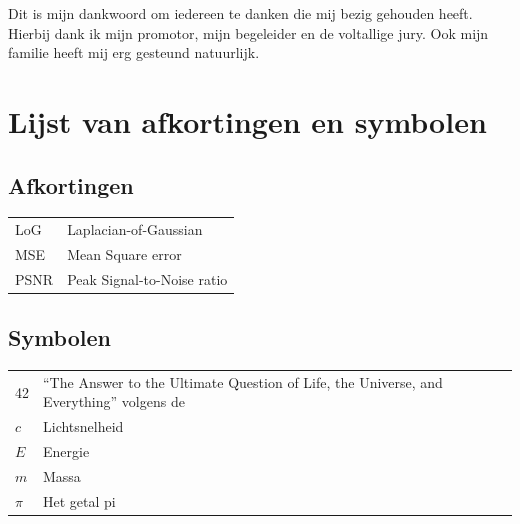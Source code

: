 \documentclass[master=elt,masteroption=ec]{kulemt}
\begin{document}
\begin{preface}
  Dit is mijn dankwoord om iedereen te danken die mij bezig gehouden heeft.
  Hierbij dank ik mijn promotor, mijn begeleider en de voltallige jury.
  Ook mijn familie heeft mij erg gesteund natuurlijk.
\end{preface}

\tableofcontents*

\begin{abstract}
  In dit \texttt{abstract} environment wordt een al dan niet uitgebreide
  samenvatting van het werk gegeven. De bedoeling is wel dat dit tot
  1~bladzijde beperkt blijft.

  \lipsum[1]
\end{abstract}

\listoffiguresandtables
\chapter{Lijst van afkortingen en symbolen}
\section*{Afkortingen}
\begin{flushleft}
  \renewcommand{\arraystretch}{1.1}
  \begin{tabularx}{\textwidth}{@{}p{12mm}X@{}}
    LoG   & Laplacian-of-Gaussian \\
    MSE   & Mean Square error \\
    PSNR  & Peak Signal-to-Noise ratio \\
  \end{tabularx}
\end{flushleft}
\section*{Symbolen}
\begin{flushleft}
  \renewcommand{\arraystretch}{1.1}
  \begin{tabularx}{\textwidth}{@{}p{12mm}X@{}}
    42    & ``The Answer to the Ultimate Question of Life, the Universe,
            and Everything'' volgens de \cite{h2g2} \\
    $c$   & Lichtsnelheid \\
    $E$   & Energie \\
    $m$   & Massa \\
    $\pi$ & Het getal pi \\
  \end{tabularx}
\end{flushleft}
\end{document}
